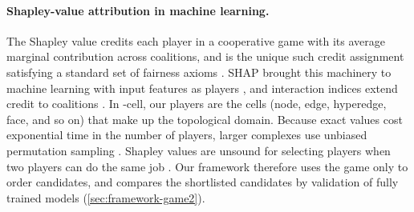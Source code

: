 \paragraph{Shapley-value attribution in machine learning.} The Shapley value credits each player in a cooperative game with its average marginal contribution across coalitions, and is the unique such credit assignment satisfying a standard set of fairness axioms \citep{shapley1953value}.
SHAP brought this machinery to machine learning with input features as players \citep{lundberg2017shap}, and interaction indices extend credit to coalitions \citep{grabisch1999axiomatic}. In \method-cell, our players are the cells (node, edge, hyperedge, face, and so on) that make up the topological domain. Because exact values cost exponential time in the number of players,  larger complexes use unbiased permutation sampling \citep{castro2009polynomial,strumbelj2010efficient}. Shapley values are unsound for selecting players when two players can do the same job \citep{fryer2021shapley}. Our framework therefore uses the game only to order candidates, and compares the shortlisted candidates by validation of fully trained models (\cref{sec:framework-game2}).

